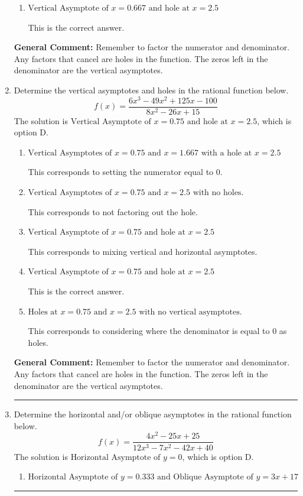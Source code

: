 \documentclass{extbook}[14pt]
\newcommand{\litem}[1]{\item #1

\rule{\textwidth}{0.4pt}}
\begin{document}
\begin{enumerate}
{\begin{enumerate}[label=\Alph*.]
This corresponds to not factoring out the hole.
\item \( \text{Vertical Asymptote of } x = 0.667 \text{ and hole at } x = 2.5 \)

This is the correct answer.
\end{enumerate}

\textbf{General Comment:} Remember to factor the numerator and denominator. Any factors that cancel are holes in the function. The zeros left in the denominator are the vertical asymptotes.
}
\litem{
Determine the vertical asymptotes and holes in the rational function below.
\[ f(x) = \frac{6x^{3} -49 x^{2} +125 x -100}{8x^{2} -26 x + 15} \]The solution is \( \text{Vertical Asymptote of } x = 0.75 \text{ and hole at } x = 2.5 \), which is option D.\begin{enumerate}[label=\Alph*.]
\item \( \text{Vertical Asymptotes of } x = 0.75 \text{ and } x = 1.667 \text{ with a hole at } x = 2.5 \)

This corresponds to setting the numerator equal to 0.
\item \( \text{Vertical Asymptotes of } x = 0.75 \text{ and } x = 2.5 \text{ with no holes.} \)

This corresponds to not factoring out the hole.
\item \( \text{Vertical Asymptote of } x = 0.75 \text{ and hole at } x = 2.5 \)

This corresponds to mixing vertical and horizontal asymptotes.
\item \( \text{Vertical Asymptote of } x = 0.75 \text{ and hole at } x = 2.5 \)

This is the correct answer.
\item \( \text{Holes at } x = 0.75 \text{ and } x = 2.5 \text{ with no vertical asymptotes.} \)

This corresponds to considering where the denominator is equal to 0 as holes.
\end{enumerate}

\textbf{General Comment:} Remember to factor the numerator and denominator. Any factors that cancel are holes in the function. The zeros left in the denominator are the vertical asymptotes.
}
\litem{
Determine the horizontal and/or oblique asymptotes in the rational function below.
\[ f(x) = \frac{4x^{2} -25 x + 25}{12x^{3} -7 x^{2} -42 x + 40} \]The solution is \( \text{Horizontal Asymptote of } y = 0 \), which is option D.\begin{enumerate}[label=\Alph*.]
\item \( \text{Horizontal Asymptote of } y = 0.333 \text{ and Oblique Asymptote of } y = 3x + 17 \)


\end{enumerate}}
\end{enumerate}
\end{document}
